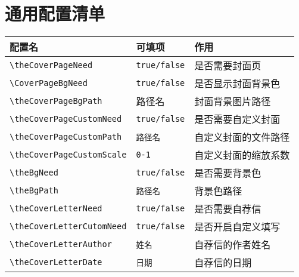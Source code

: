 \documentclass[a4paper,12pt]{ctexart}
\begin{document}
	\newpage
	\section{通用配置清单}
	\begin{table}[!h]
		\centering

		\begin{tabularx}{\textwidth}{|l|l|>{\raggedright\arraybackslash}X|}
			\hline
			\textbf{配置名}                    & \textbf{可填项}                                        & \textbf{作用}                      \\
			\hline
			\texttt{\textbackslash theCoverPageNeed}        & \texttt{true/false}                               & 是否需要封面页                   \\
			\hline
			\texttt{\textbackslash CoverPageBgNeed}        & \texttt{true/false}                               & 是否显示封面背景色               \\
			\hline
			\texttt{\textbackslash theCoverPageBgPath}     & 路径名                & 封面背景图片路径                 \\
			\hline
			\texttt{\textbackslash theCoverPageCustomNeed} & \texttt{true/false}                               & 是否需要自定义封面               \\
			\hline
			\texttt{\textbackslash theCoverPageCustomPath} & \texttt{路径名}& 自定义封面的文件路径             \\
			\hline
			\texttt{\textbackslash theCoverPageCustomScale} & \texttt{0-1}& 自定义封面的缩放系数             \\
			\hline
			\texttt{\textbackslash theBgNeed}              & \texttt{true/false}                               & 是否需要背景色                   \\
			\hline
			\texttt{\textbackslash theBgPath}              & \texttt{路径名}& 背景色路径                       \\
			\hline
			\texttt{\textbackslash theCoverLetterNeed}     & \texttt{true/false}                               & 是否需要自荐信                   \\
			\hline
			\texttt{\textbackslash theCoverLetterCutomNeed} & \texttt{true/false}                               & 是否开启自定义填写               \\
			\hline
			\texttt{\textbackslash theCoverLetterAuthor}   & \texttt{姓名}& 自荐信的作者姓名                 \\
			\hline
			\texttt{\textbackslash theCoverLetterDate}     & \texttt{日期}& 自荐信的日期                     \\

\end{tabularx}
\end{table}
\end{document}
